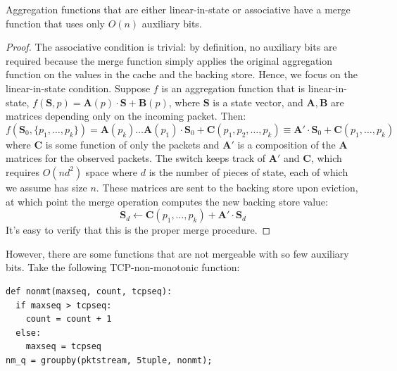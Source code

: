 \begin{theorem}
 Aggregation functions that are either linear-in-state or associative have a
merge function that uses only $O(n)$ auxiliary bits.
\end{theorem}
\begin{proof}
The associative condition is trivial: by definition, no auxiliary bits are required because the merge function simply applies the original aggregation function on the values in the cache and the backing store. Hence, we focus on the linear-in-state condition.
Suppose $f$ is an aggregation function that is linear-in-state, \ie $f(\mathbf{S}, p) = \mathbf{A}(p) \cdot \mathbf{S} + \mathbf{B}(p)$, where $\mathbf{S}$ is a state vector, and $\mathbf{A,B}$ are matrices depending only on the incoming packet. Then:
\[ f(\mathbf{S}_0, \{p_1, \ldots, p_k\}) = \mathbf{A}(p_k)\ldots \mathbf{A}(p_1) \cdot \mathbf{S}_0 + \mathbf{C}(p_1, p_2, \ldots, p_k) \equiv \mathbf{A'} \cdot \mathbf{S}_0 + \mathbf{C}(p_1, \ldots, p_k)\]
where $\mathbf{C}$ is some function of only the packets and $\mathbf{A'}$ is a composition of the $\mathbf{A}$ matrices for the observed packets. The switch keeps track of $\mathbf{A'}$ and $\mathbf{C}$, which requires $O(nd^2)$ space where $d$ is the number of pieces of state, each of which we assume has size $n$. These matrices are sent to the backing store upon eviction, at which point the merge operation computes the new backing store value:
\[ \mathbf{S}_d \leftarrow \mathbf{C}(p_1, \ldots, p_k) + \mathbf{A'} \cdot \mathbf{S}_d \]
It's easy to verify that this is the proper merge procedure.
\end{proof}

However, there are some functions that are not mergeable with so few auxiliary bits. Take the following TCP-non-monotonic function:
\begin{verbatim}
def nonmt(maxseq, count, tcpseq):
  if maxseq > tcpseq:
    count = count + 1
  else:
    maxseq = tcpseq
nm_q = groupby(pktstream, 5tuple, nonmt);
\end{verbatim}

